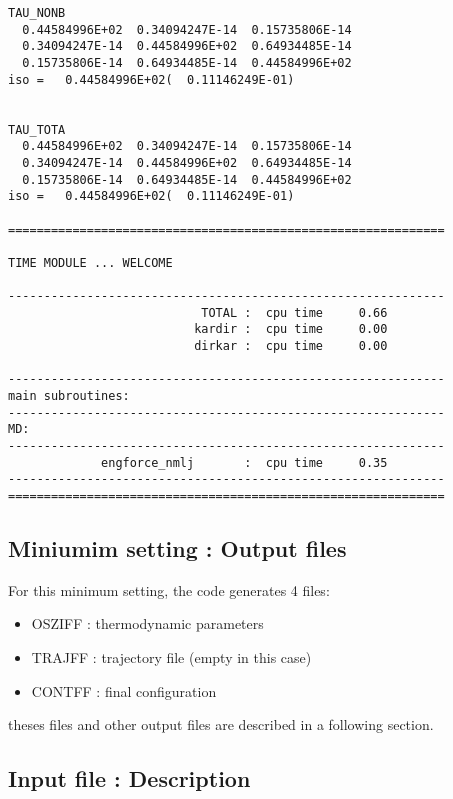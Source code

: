 \documentclass[a4paper,8pt]{article}
\begin{document}
\begin{verbatim}
TAU_NONB
  0.44584996E+02  0.34094247E-14  0.15735806E-14
  0.34094247E-14  0.44584996E+02  0.64934485E-14
  0.15735806E-14  0.64934485E-14  0.44584996E+02
iso =   0.44584996E+02(  0.11146249E-01)


TAU_TOTA
  0.44584996E+02  0.34094247E-14  0.15735806E-14
  0.34094247E-14  0.44584996E+02  0.64934485E-14
  0.15735806E-14  0.64934485E-14  0.44584996E+02
iso =   0.44584996E+02(  0.11146249E-01)

=============================================================

TIME MODULE ... WELCOME

-------------------------------------------------------------
                           TOTAL :  cpu time     0.66
                          kardir :  cpu time     0.00
                          dirkar :  cpu time     0.00

-------------------------------------------------------------
main subroutines:
-------------------------------------------------------------
MD:
-------------------------------------------------------------
             engforce_nmlj       :  cpu time     0.35
-------------------------------------------------------------
=============================================================
\end{verbatim}

\subsection{Miniumim setting : Output files}
For this minimum setting, the code generates 4 files:

\begin{itemize}
\item OSZIFF : thermodynamic parameters 
\item TRAJFF : trajectory file (empty in this case) 
\item CONTFF : final configuration
\end{itemize}
theses files and other output files are described in a following section.

\newpage

\subsection{Input file : Description}

\end{document}

